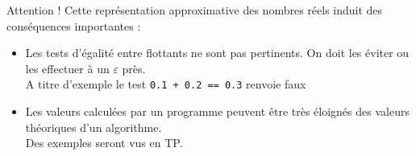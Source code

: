 \documentclass[10pt]{beamer}
\begin{document}
\begin{frame}{\Ctitle}{\stitle}
    \begin{alertblock}{\textcolor{yellow}{\important} Attention !}
        Cette représentation approximative des nombres réels induit des conséquences importantes :
        \begin{itemize}
            \item<2-> Les tests d'égalité entre flottants ne sont pas pertinents. On doit les éviter ou les effectuer à un $\varepsilon$ près. \\
             A titre d'exemple le test {\tt 0.1 + 0.2 == 0.3} renvoie faux 
            \item<4-> Les valeurs calculées par un programme peuvent être très éloignés des valeurs théoriques d'un algorithme.\\
             Des exemples seront vus en TP.
        \end{itemize}
    \end{alertblock}
\end{frame}
\end{document}
